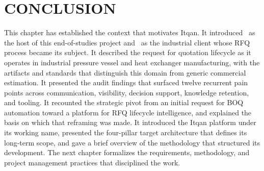 \section{CONCLUSION}
This chapter has established the context that motivates Itqan. It introduced \hostCompany\ as the host of this end-of-studies project and \clientCompany\ as the industrial client whose RFQ process became its subject. It described the request for quotation lifecycle as it operates in industrial pressure vessel and heat exchanger manufacturing, with the artifacts and standards that distinguish this domain from generic commercial estimation. It presented the audit findings that surfaced twelve recurrent pain points across communication, visibility, decision support, knowledge retention, and tooling. It recounted the strategic pivot from an initial request for BOQ automation toward a platform for RFQ lifecycle intelligence, and explained the basis on which that reframing was made. It introduced the Itqan platform under its working name, presented the four-pillar target architecture that defines its long-term scope, and gave a brief overview of the methodology that structured its development. The next chapter formalizes the requirements, methodology, and project management practices that disciplined the work.